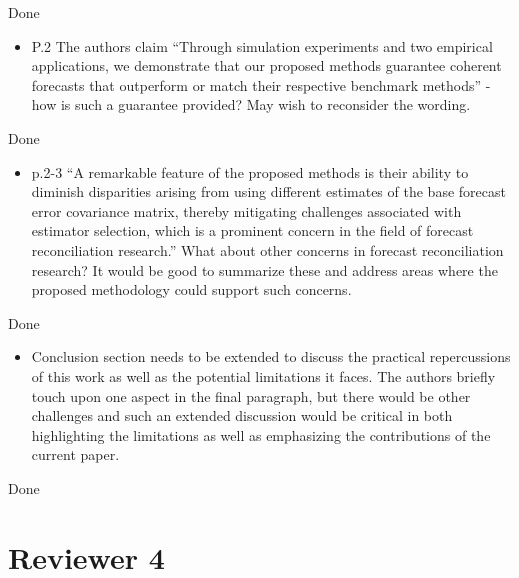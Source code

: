 \documentclass[11pt,a4paper,]{article}
\providecommand{\tightlist}{%
  \setlength{\itemsep}{0pt}\setlength{\parskip}{0pt}}
\renewenvironment{quote}
               {\list{}{\rightmargin\leftmargin}%
                \item\relax\color[RGB]{0,150,0}}
               {\endlist}
\begin{document}
\begin{quote}
Done
\end{quote}

\begin{itemize}
\tightlist
\item
  P.2 The authors claim ``Through simulation experiments and two
  empirical applications, we demonstrate that our proposed methods
  guarantee coherent forecasts that outperform or match their respective
  benchmark methods'' - how is such a guarantee provided? May wish to
  reconsider the wording.
\end{itemize}

\begin{quote}
Done
\end{quote}

\begin{itemize}
\tightlist
\item
  p.2-3 ``A remarkable feature of the proposed methods is their ability
  to diminish disparities arising from using different estimates of the
  base forecast error covariance matrix, thereby mitigating challenges
  associated with estimator selection, which is a prominent concern in
  the field of forecast reconciliation research.'' What about other
  concerns in forecast reconciliation research? It would be good to
  summarize these and address areas where the proposed methodology could
  support such concerns.
\end{itemize}

\begin{quote}
Done
\end{quote}

\begin{itemize}
\tightlist
\item
  Conclusion section needs to be extended to discuss the practical
  repercussions of this work as well as the potential limitations it
  faces. The authors briefly touch upon one aspect in the final
  paragraph, but there would be other challenges and such an extended
  discussion would be critical in both highlighting the limitations as
  well as emphasizing the contributions of the current paper.
\end{itemize}

\begin{quote}
Done
\end{quote}

\section{Reviewer 4}\label{reviewer-4}
\end{document}
